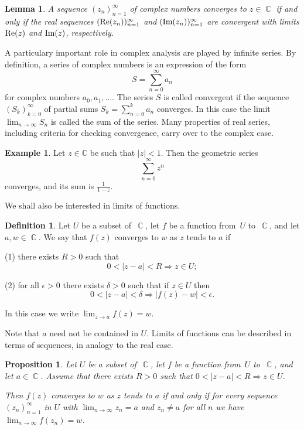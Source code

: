 \documentclass{amsproc}
\newtheorem{lemma}[theorem]{Lemma}
\newtheorem{proposition}[theorem]{Proposition}
\theoremstyle{definition}
\newtheorem{definition}[theorem]{Definition}
\newtheorem{example}[theorem]{Example}
\theoremstyle{remark}
\renewcommand{\Im}{\mathop{\textup{Im}}}
\renewcommand{\Re}{\mathop{\textup{Re}}}
\DeclareMathOperator{\C}{\mathbb{C}}
\numberwithin{equation}{section}
\begin{document}
\begin{lemma}
A sequence $ (z_n)_{n = 1}^\infty $ of complex numbers converges to $ z \in \C $ if and only if the real sequences $ (\Re(z_n))_{n = 1}^\infty $
and $ (\Im(z_n))_{n = 1}^\infty $ are convergent with limits $ \Re(z) $ and $ \Im(z) $, respectively.
\end{lemma}

A particulary important role in complex analysis are played by infinite series. By definition, a series of complex numbers is an expression of the form
$$
S = \sum_{n = 0}^\infty a_n
$$
for complex numbers $ a_0, a_1, \dots $.
The series $ S $ is called convergent if the sequence $ (S_k)_{k = 0}^\infty $ of partial sums $ S_k = \sum_{n = 0}^k a_n $ converges.
In this case the limit $ \lim_{n\to\infty} S_n $ is called the sum of the series.
Many properties of real series, including criteria for checking convergence, carry over to the complex case.

\begin{example}
Let $ z \in \mathbb{C} $ be such that $ |z| < 1 $. Then the geometric series
$$
\sum_{n = 0}^\infty z^n
$$
converges, and its sum is $ \frac{1}{1 - z} $.
\end{example}

We shall also be interested in limits of functions.

\begin{definition}
Let $ U $ be a subset of~$ \C $, let $ f $ be a function from~$ U $ to~$ \C $, and let $ a,w \in \C $. We say that $ f(z) $ converges to $ w $ as $ z $ tends to $ a $ if

(1) there exists $ R > 0 $ such that
$$
0 < |z - a| < R \Rightarrow z \in U;
$$

(2) for all $ \epsilon > 0 $ there exists $ \delta > 0 $ such that if $ z \in U $ then
$$
0 < |z - a| < \delta \Rightarrow \left|f(z) - w\right| < \epsilon.
$$

In this case we write $ \lim_{z \to a} f(z) = w $.
\end{definition}

Note that $ a $ need not be contained in $ U $. Limits of functions can be described in terms of sequences, in analogy to the real case.

\begin{proposition}
Let $ U $ be a subset of~$ \C $, let $ f $ be a function from~$ U $ to~$ \C $, and let $ a \in \C $. Assume that there exists $ R > 0 $ such that
$ 0 < |z - a| < R \Rightarrow z \in U $.

Then $ f(z) $ converges to $ w $ as $ z $ tends to $ a $ if
and only if for every sequence $ (z_n)_{n = 1}^\infty $ in $ U $ with $ \lim_{n \to \infty} z_n = a $ and $ z_n \neq a $ for all $ n $
we have $ \lim_{n \to \infty} f(z_n) = w $.
\end{proposition}
\end{document}

